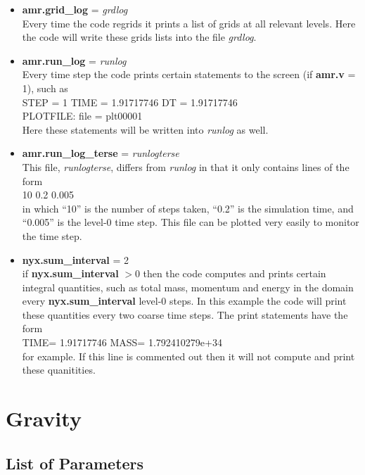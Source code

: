 \begin{itemize}

\item {\bf amr.grid\_log} = {\em grdlog} \\
Every time the code regrids it prints a list of grids at all relevant levels.  
Here the code will write these grids lists into the file {\em grdlog}.

\item {\bf amr.run\_log} = {\em runlog} \\ 
Every time step the code prints certain statements to the screen (if {\bf amr.v} = 1), such as \\
STEP = 1 TIME = 1.91717746 DT = 1.91717746 \\
PLOTFILE: file = plt00001 \\
Here these statements will be written into {\em runlog} as well.

\item {\bf amr.run\_log\_terse} = {\em runlogterse} \\ 
This file, {\em runlogterse}, differs from {\em runlog} in that it only contains lines
of the form \\ 
10  0.2  0.005 \\
in which ``10'' is the number of steps taken, ``0.2'' is the simulation time, and ``0.005'' is the 
level-0 time step.  This file can be plotted very easily to monitor the time step.

\item {\bf nyx.sum\_interval} = 2 \\
if {\bf nyx.sum\_interval} $> 0$ then the code computes and prints certain integral quantities, 
such as total mass, momentum and energy in the domain every {\bf nyx.sum\_interval} level-0 steps. 
In this example the code will print these quantities every two coarse time steps.  The print 
statements have the form \\
TIME= 1.91717746 MASS= 1.792410279e+34 \\
for example. 
If this line is commented out then it will not compute and print these quanitities.

\end{itemize}

\section{Gravity}

\subsection{List of Parameters}

